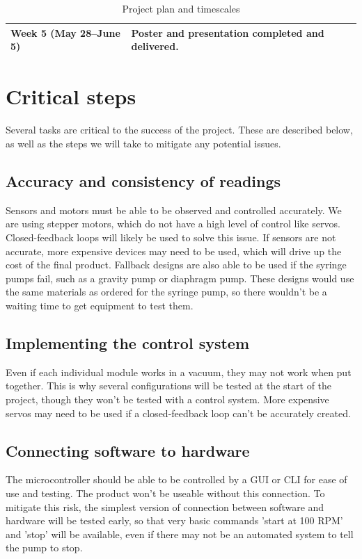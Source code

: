 \documentclass[10pt, a4paper]{article}
\begin{document}
\begin{table}[H]
\begin{tabularx}{\linewidth}{>{\raggedright\arraybackslash}p{4cm} X}
        Week 5 (May 28--June 5)
                             & Poster and presentation completed and delivered.                                                                                                                                                                                                                                                                                          \\

        \bottomrule
    \end{tabularx}
    \caption{Project plan and timescales}
\end{table}


\section{Critical steps}
Several tasks are critical to the success of the project. These are described below, as well as the steps we will take to mitigate any potential issues.

\subsection{Accuracy and consistency of readings}
Sensors and motors must be able to be observed and controlled accurately. We are using stepper motors, which do not have a high level of control like servos. Closed-feedback loops will likely be used to solve this issue. If sensors are not accurate, more expensive devices may need to be used, which will drive up the cost of the final product. Fallback designs are also able to be used if the syringe pumps fail, such as a gravity pump or diaphragm pump. These designs would use the same materials as ordered for the syringe pump, so there wouldn't be a waiting time to get equipment to test them.

\subsection{Implementing the control system}
Even if each individual module works in a vacuum, they may not work when put together. This is why several configurations will be tested at the start of the project, though they won't be tested with a control system. More expensive servos may need to be used if a closed-feedback loop can't be accurately created.

\subsection{Connecting software to hardware}
The microcontroller should be able to be controlled by a GUI or CLI for ease of use and testing. The product won't be useable without this connection. To mitigate this risk, the simplest version of connection between software and hardware will be tested early, so that very basic commands 'start at 100 RPM' and 'stop' will be available, even if there may not be an automated system to tell the pump to stop.
\end{document}
